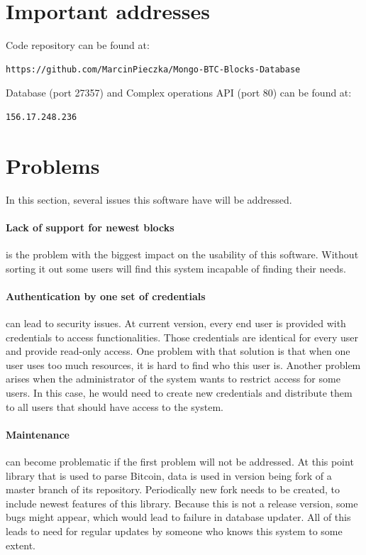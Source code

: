 \documentclass[12pt, en, eng, twoside, final]{mgr}
\begin{document}
\section{Important addresses}
Code repository can be found at:
\begin{verbatim}
https://github.com/MarcinPieczka/Mongo-BTC-Blocks-Database
\end{verbatim}
\noindent
Database (port 27357) and Complex operations API (port 80) can be found at:
\begin{verbatim}
156.17.248.236
\end{verbatim}

\section{Problems}
In this section, several issues this software have will be addressed.

\paragraph{Lack of support for newest blocks} is the problem with the biggest impact on the usability of this software. Without sorting it out some users will find this system incapable of finding their needs. 

\paragraph{Authentication by one set of credentials} can lead to security issues. At current version, every end user is provided with credentials to access functionalities. Those credentials are identical for every user and provide read-only access. One problem with that solution is that when one user uses too much resources, it is hard to find who this user is. Another problem arises when the administrator of the system wants to restrict access for some users. In this case, he would need to create new credentials and distribute them to all users that should have access to the system.

\paragraph{Maintenance} can become problematic if the first problem will not be addressed. At this point library that is used to parse Bitcoin, data is used in version being fork of a master branch of its repository. Periodically new fork needs to be created, to include newest features of this library. Because this is not a release version, some bugs might appear, which would lead to failure in database updater. All of this leads to need for regular updates by someone who knows this system to some extent. 
\end{document}
